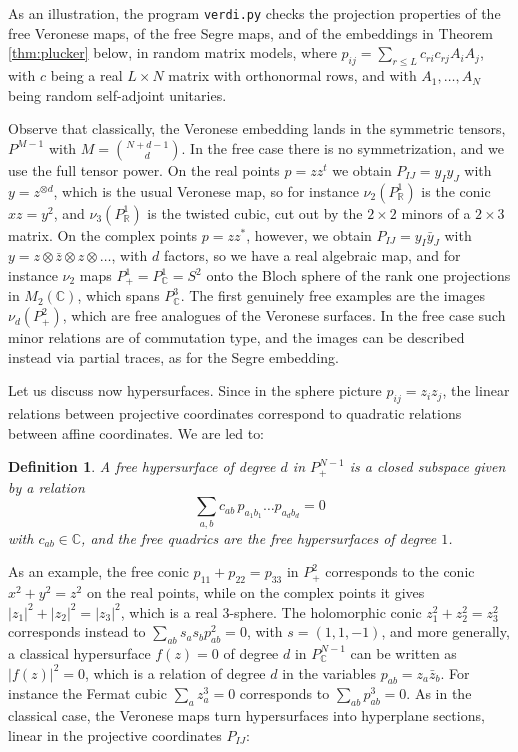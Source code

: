 \documentclass[11pt]{article}
\theoremstyle{plain}
\newtheorem{definition}[theorem]{Definition}
\begin{document}
As an illustration, the program {\tt verdi.py} checks the projection properties of the free Veronese maps, of the free Segre maps, and of the embeddings in Theorem \ref{thm:plucker} below, in random matrix models, where $p_{ij}=\sum_{r\leq L}c_{ri}c_{rj}A_iA_j$, with $c$ being a real $L\times N$ matrix with orthonormal rows, and with $A_1,\ldots,A_N$ being random self-adjoint unitaries.

\bigskip

Observe that classically, the Veronese embedding lands in the symmetric tensors, $P^{M-1}$ with $M=\binom{N+d-1}{d}$. In the free case there is no symmetrization, and we use the full tensor power. On the real points $p=zz^t$ we obtain $P_{IJ}=y_Iy_J$ with $y=z^{\otimes d}$, which is the usual Veronese map, so for instance $\nu_2(P^1_\mathbb R)$ is the conic $xz=y^2$, and $\nu_3(P^1_\mathbb R)$ is the twisted cubic, cut out by the $2\times2$ minors of a $2\times3$ matrix. On the complex points $p=zz^*$, however, we obtain $P_{IJ}=y_I\bar{y}_J$ with $y=z\otimes\bar{z}\otimes z\otimes\ldots$, with $d$ factors, so we have a real algebraic map, and for instance $\nu_2$ maps $P^1_+=P^1_\mathbb C=S^2$ onto the Bloch sphere of the rank one projections in $M_2(\mathbb C)$, which spans $P^3_\mathbb C$. The first genuinely free examples are the images $\nu_d(P^2_+)$, which are free analogues of the Veronese surfaces. In the free case such minor relations are of commutation type, and the images can be described instead via partial traces, as for the Segre embedding.

\bigskip

Let us discuss now hypersurfaces. Since in the sphere picture $p_{ij}=z_iz_j$, the linear relations between projective coordinates correspond to quadratic relations between affine coordinates. We are led to:

\begin{definition}
A free hypersurface of degree $d$ in $P^{N-1}_+$ is a closed subspace given by a relation
$$\sum_{a,b}c_{ab}\,p_{a_1b_1}\ldots p_{a_db_d}=0$$
with $c_{ab}\in\mathbb C$, and the free quadrics are the free hypersurfaces of degree $1$.
\end{definition}

As an example, the free conic $p_{11}+p_{22}=p_{33}$ in $P^2_+$ corresponds to the conic $x^2+y^2=z^2$ on the real points, while on the complex points it gives $|z_1|^2+|z_2|^2=|z_3|^2$, which is a real 3-sphere. The holomorphic conic $z_1^2+z_2^2=z_3^2$ corresponds instead to $\sum_{ab}s_as_bp_{ab}^2=0$, with $s=(1,1,-1)$, and more generally, a classical hypersurface $f(z)=0$ of degree $d$ in $P^{N-1}_\mathbb C$ can be written as $|f(z)|^2=0$, which is a relation of degree $d$ in the variables $p_{ab}=z_a\bar{z}_b$. For instance the Fermat cubic $\sum_az_a^3=0$ corresponds to $\sum_{ab}p_{ab}^3=0$. As in the classical case, the Veronese maps turn hypersurfaces into hyperplane sections, linear in the projective coordinates $P_{IJ}$:
\end{document}
